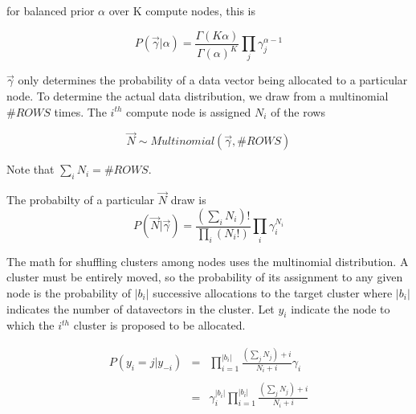 \documentclass{article}
\begin{document}
for balanced prior $\alpha$ over K compute nodes, this is

\begin{equation}
P(\vec \gamma|\alpha) = \frac{\Gamma(K \alpha)}{\Gamma(\alpha)^K} \prod_j \gamma_j^{\alpha-1}
\end{equation}

$\vec \gamma$ only determines the probability of a data vector being allocated to a particular node.  To determine the actual data distribution, we draw from a multinomial $\#ROWS$ times.  The $i^{th}$ compute node is assigned ${N_i}$ of the rows

\begin{equation}
\vec N \sim Multinomial(\vec \gamma,\#ROWS)
\end{equation}

Note that $\sum_i N_i = \#ROWS$.

The probabilty of a particular $\vec N$ draw is
\begin{equation}
P(\vec N|\vec \gamma) = \frac{(\sum_i N_i)!}{\prod_i (N_i!)} \prod_i \gamma_i^{N_i}
\end{equation}

The math for shuffling clusters among nodes uses the multinomial distribution.  A cluster must be entirely moved, so the probability of its assignment to any given node is the probability of $|b_i|$ successive allocations to the target cluster where $|b_i|$ indicates the number of datavectors in the cluster.  Let $y_i$ indicate the node to which the $i^{th}$ cluster is proposed to be allocated.

\begin{equation}
\begin{matrix}
P(y_i=j|y_{-i}) & = & \prod_{i=1}^{|b_i|} \frac{(\sum_j N_j)+i}{N_i + i} \gamma_i \\
\\
& = & \gamma_i ^{|b_i|} \prod_{i=1}^{|b_i|} \frac{(\sum_j N_j)+i}{N_i + i}
\end{matrix}
\end{equation}
\end{document}
